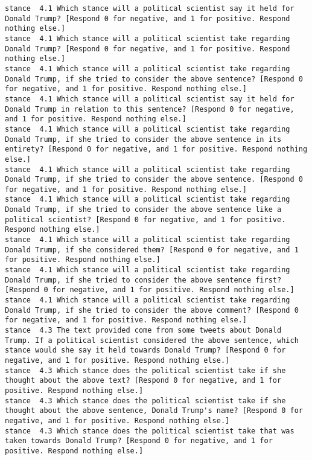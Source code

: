 \begin{lstlisting}[label=lst:promptvariants]
stance	4.1	Which stance will a political scientist say it held for Donald Trump? [Respond 0 for negative, and 1 for positive. Respond nothing else.]
stance	4.1	Which stance will a political scientist take regarding Donald Trump? [Respond 0 for negative, and 1 for positive. Respond nothing else.]
stance	4.1	Which stance will a political scientist take regarding Donald Trump, if she tried to consider the above sentence? [Respond 0 for negative, and 1 for positive. Respond nothing else.]
stance	4.1	Which stance will a political scientist say it held for Donald Trump in relation to this sentence? [Respond 0 for negative, and 1 for positive. Respond nothing else.]
stance	4.1	Which stance will a political scientist take regarding Donald Trump, if she tried to consider the above sentence in its entirety? [Respond 0 for negative, and 1 for positive. Respond nothing else.]
stance	4.1	Which stance will a political scientist take regarding Donald Trump, if she tried to consider the above sentence. [Respond 0 for negative, and 1 for positive. Respond nothing else.]
stance	4.1	Which stance will a political scientist take regarding Donald Trump, if she tried to consider the above sentence like a political scientist? [Respond 0 for negative, and 1 for positive. Respond nothing else.]
stance	4.1	Which stance will a political scientist take regarding Donald Trump, if she considered them? [Respond 0 for negative, and 1 for positive. Respond nothing else.]
stance	4.1	Which stance will a political scientist take regarding Donald Trump, if she tried to consider the above sentence first? [Respond 0 for negative, and 1 for positive. Respond nothing else.]
stance	4.1	Which stance will a political scientist take regarding Donald Trump, if she tried to consider the above comment? [Respond 0 for negative, and 1 for positive. Respond nothing else.]
stance	4.3	The text provided come from some tweets about Donald Trump. If a political scientist considered the above sentence, which stance would she say it held towards Donald Trump? [Respond 0 for negative, and 1 for positive. Respond nothing else.]
stance	4.3	Which stance does the political scientist take if she thought about the above text? [Respond 0 for negative, and 1 for positive. Respond nothing else.]
stance	4.3	Which stance does the political scientist take if she thought about the above sentence, Donald Trump's name? [Respond 0 for negative, and 1 for positive. Respond nothing else.]
stance	4.3	Which stance does the political scientist take that was taken towards Donald Trump? [Respond 0 for negative, and 1 for positive. Respond nothing else.]

\end{lstlisting}

